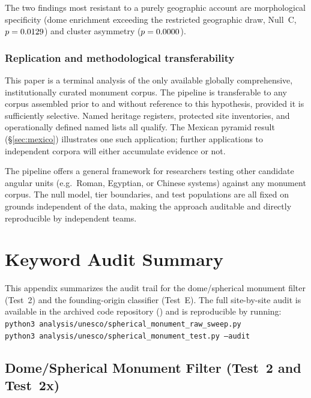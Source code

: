 \documentclass[HARVARD,twocolumn]{USG}
\begin{document}
The two findings most resistant to a purely geographic account are
morphological specificity (dome enrichment exceeding the restricted
geographic draw, Null~C, $p = 0.0129$) and cluster
asymmetry ($p = 0.0000$).

\subsubsection*{Replication and methodological transferability}

This paper is a terminal analysis of the only available globally
comprehensive, institutionally curated monument corpus. The pipeline is
transferable to any corpus assembled prior to and without reference to
this hypothesis, provided it is sufficiently selective. Named heritage
registers, protected site inventories, and operationally defined named
lists all qualify. The Mexican pyramid result (\S\ref{sec:mexico})
illustrates one such application; further applications to independent
corpora will either accumulate evidence or not.

The pipeline offers a general framework for researchers testing other
candidate angular units (e.g.\ Roman, Egyptian, or Chinese systems) against
any monument corpus. The null model, tier boundaries, and test populations
are all fixed on grounds independent of the data, making the approach
auditable and directly reproducible by independent teams.

\appendix
\newpage

\section{Keyword Audit Summary}
\label{sec:kwdaudit}

This appendix summarizes the audit trail for the dome/spherical monument
filter (Test~2) and the founding-origin classifier (Test~E).
The full site-by-site audit is available in the archived code repository
(\citealt{tenenbaum2026audit}) and is reproducible by running:\\
\texttt{python3 analysis/unesco/spherical\_monument\_raw\_sweep.py}\\
\texttt{python3 analysis/unesco/spherical\_monument\_test.py --audit}

\subsection{Dome/Spherical Monument Filter (Test~2 and Test~2x)}
\label{sec:kwdaudit_dome}
\end{document}

